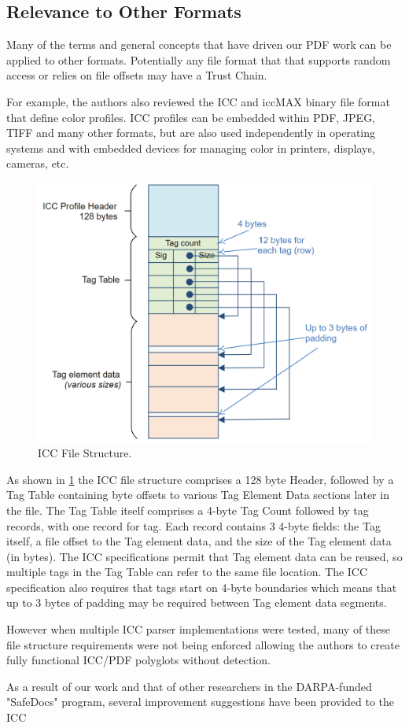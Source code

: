 \subsection{Relevance to Other Formats}
\label{sec:other-formats}

Many of the terms and general concepts that have driven our PDF work
can be applied to other formats. Potentially any file format that that supports random access or relies on file offsets may have a Trust Chain.

For example, the authors also reviewed the ICC \cite{isotc130jwg7ISO15076120102010} and 
iccMAX \cite{iccSpecificationICC20192019} binary file format that define color profiles.
ICC profiles can be embedded within PDF, JPEG, TIFF and many other formats, but are also 
used independently in operating systems and with embedded devices for managing color in 
printers, displays, cameras, etc.

\begin{figure}[t]
    \centering
    \includegraphics[width=0.85\linewidth]{figures/icc.png}
    \caption{ICC File Structure.}
    \label{fig:icc-structure}
\end{figure}

As shown in \cref{fig:icc-structure} the ICC file structure comprises a 128 byte Header, followed by a 
Tag Table containing byte offsets to various Tag Element Data sections later in the file. 
The Tag Table itself comprises a 4-byte Tag Count followed by tag records, with one record for tag. 
Each record contains 3 4-byte fields: the Tag itself, a file offset to the Tag element data, and the size of the Tag element data (in bytes).
The ICC specifications permit that Tag element data can be reused, so multiple tags in the Tag Table can
refer to the same file location. The ICC specification also requires that tags start on 4-byte boundaries
which means that up to 3 bytes of padding may be required between Tag element data segments.

However when multiple ICC parser implementations were tested, many of these file structure requirements
were not being enforced allowing the authors to create fully functional ICC/PDF polyglots 
without detection.

As a result of our work and that of other researchers in the DARPA-funded "SafeDocs" program, several
improvement suggestions have been provided to the ICC 
